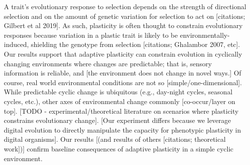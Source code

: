 A trait's evolutionary response to selection depends on the strength of directional selection and on the amount of genetic variation for selection to act on [citations; Gilbert et al 2019].
As such, plasticity is often thought to constrain evolutionary responses because variation in a plastic trait is likely to be environmentally-induced, shielding the genotype from selection [citations; Ghalambor 2007, etc]. %
Our results support that adaptive plasticity can constrain evolution in cyclically changing environments where changes are predictable; that is, sensory information is reliable, and [the environment does not change in novel ways.]
Of course, real world environmental conditions are not so [simple/one-dimensional].
While predictable cyclic change is ubiquitous (e.g., day-night cycles, seasonal cycles, etc.), other axes of environmental change commonly [co-occur/layer on top]. 
[TODO - experimental/theoretical literature on scenarios where plasticity constrains evolutionary change].
[Our experiment differs because we leverage digital evolution to directly manipulate the capacity for phenotypic plasticity in digital organisms].
Our results [(and results of others [citations; theoretical work])] confirm baseline consequences of adaptive plasticity in a simple cyclic environment.






